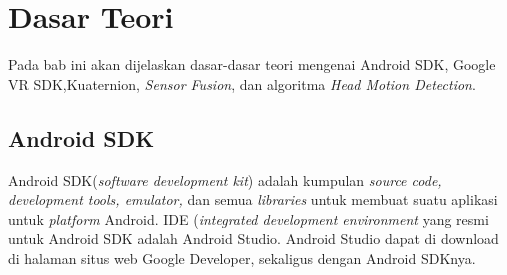 \chapter{Dasar Teori}
\label{chap:dasar_teori}
Pada bab ini akan dijelaskan dasar-dasar teori mengenai Android SDK, Google VR SDK,Kuaternion, \textit{Sensor Fusion}, dan algoritma \textit{Head Motion Detection}.

\section{Android SDK}
\label{sec:android_sdk}

Android SDK(\textit{software development kit}) adalah kumpulan \textit{source code, development tools, emulator,}\cite{developers2011android} dan semua \textit{libraries} untuk membuat suatu aplikasi untuk \textit{platform} Android. IDE (\textit{integrated development environment} yang resmi untuk Android SDK adalah Android Studio. Android Studio dapat di download di halaman situs web Google Developer\cite{developers2011android}, sekaligus dengan Android SDKnya.  

